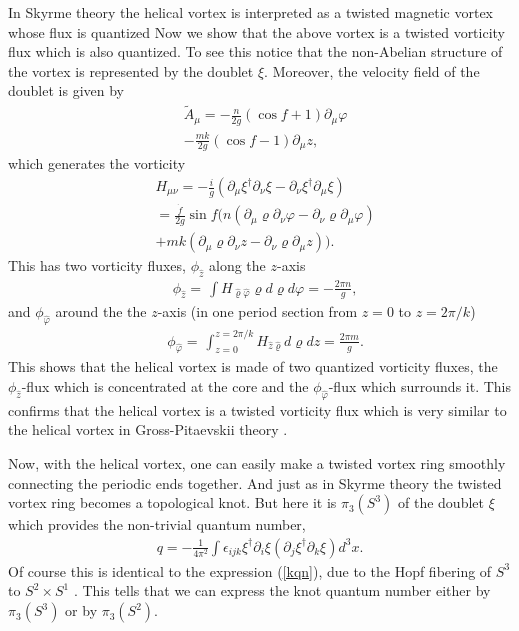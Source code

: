 \documentclass[twocolumn,showpacs,showkeys]{revtex4}
\newcommand{\bea}{\begin{eqnarray}}
\newcommand{\eea}{\end{eqnarray}}
\newcommand{\pro}{\partial}
\newcommand{\dfrac}{\displaystyle\frac}
\newcommand{\nn}{\nonumber}
\begin{document}
In Skyrme theory the helical vortex is interpreted as
a twisted magnetic vortex whose flux is quantized \cite{prl01,plb04}
Now we show that the above vortex is a twisted vorticity flux
which is also quantized.
To see this notice that the non-Abelian structure of
the vortex is represented by the doublet $\xi$.
Moreover, the velocity field 
of the doublet is given by 
\bea
&\tilde A_\mu =-\dfrac{n}{2g}(\cos{f}+1) \pro_\mu \varphi \nn\\
&-\dfrac{mk}{2g}(\cos{f}-1) \pro_\mu z,
\label{gpvel}
\eea
which generates the vorticity
\bea
&H_{\mu\nu}= -\dfrac{i}{g}(\pro_\mu \xi^{\dagger} \pro_\nu \xi
-\pro_\nu \xi^{\dagger} \pro_\mu \xi) \nn\\
&=\dfrac{\dot{f}}{2g} \sin{f}\Big(n(\pro_\mu \varrho \pro_\nu \varphi
-\pro_\nu \varrho \pro_\mu \varphi) \nn\\
&+mk(\pro_\mu \varrho \pro_\nu z
- \pro_\nu \varrho \pro_\mu z) \Big).
\label{gpvor}
\eea
This has two vorticity fluxes, $\phi_{\hat z}$
along the $z$-axis
\bea
&\phi_{\hat z}=\dfrac{}{} \int H_{{\hat \varrho}{\hat \varphi}}
\varrho d \varrho d \varphi
= -\dfrac{2\pi n}{g},
\label{gpfluxz}
\eea
and $\phi_{\hat \varphi}$ around the the $z$-axis (in one
period section from $z=0$ to $z=2\pi/k$)
\bea
&\phi_{\hat \varphi}=\dfrac{}{} \int_{z=0}^{z=2\pi/k}
H_{{\hat z}{\hat \varrho}} d \varrho dz
= \dfrac{2\pi m}{g}.
\label{gpfluxphi}
\eea
This shows that the helical vortex is made of two quantized vorticity
fluxes, the $\phi_{\hat z}$-flux which is concentrated at the core
and the $\phi_{\hat \varphi}$-flux which surrounds it. 
This confirms that the helical vortex is a twisted vorticity
flux which is very similar to the helical vortex in Gross-Pitaevskii 
theory \cite{bec5}.

Now, with the helical vortex, one can easily make a twisted vortex ring
smoothly connecting the periodic ends together. 
And just as in Skyrme theory the twisted vortex ring
becomes a topological knot. But
here it is $\pi_3(S^3)$ of the doublet $\xi$ which provides the
non-trivial quantum number, 
\bea
q = - \dfrac {1}{4\pi^2} \int \epsilon_{ijk} \xi^{\dagger}
\partial_i \xi ( \partial_j \xi^{\dagger}
\partial_k \xi ) d^3 x.
\label{beckqn}
\eea
Of course this is identical to the expression (\ref{kqn}), due to the
Hopf fibering of $S^3$ to $S^2 \times S^1$ \cite{bec5}. This
tells that we can express the knot quantum number either
by $\pi_3(S^3)$ or by $\pi_3(S^2)$. 
\end{document}
